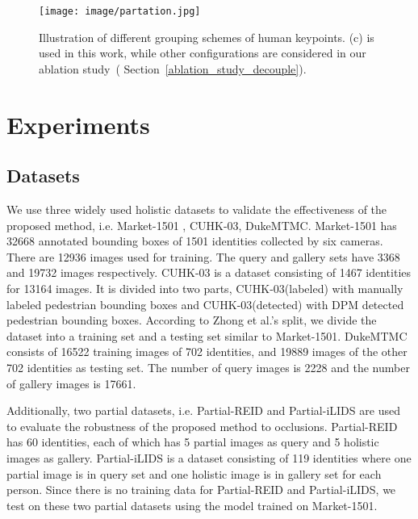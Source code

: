 \documentclass[10pt,twocolumn,letterpaper]{article}
\begin{document}
\begin{figure}[h]		 \vspace{-1mm}
	\begin{center}
		\begin{minipage}[t]{1.0\linewidth}
\texttt{[image: image/partation.jpg]}
		\end{minipage}
	\end{center}
	\vspace{-4mm}
	\caption{Illustration of different grouping schemes of human keypoints. (c) is used in this work, while other configurations are considered in our ablation study~( Section~\ref{ablation_study_decouple}).}
	\label{image:partation}
	\vspace{-5mm}
\end{figure}


\section{Experiments}

\subsection{Datasets}
We use three widely used holistic datasets to validate the effectiveness of the proposed method, i.e. Market-1501 \cite{zheng2015scalable}, CUHK-03\cite{li2014deepreid}, DukeMTMC\cite{zheng2017unlabeled,ristani2016MTMC}. Market-1501 has 32668 annotated bounding boxes of 1501 identities collected by six cameras. There are 12936 images used for training. The query and gallery sets have 3368 and 19732 images respectively. CUHK-03 is a dataset consisting of 1467 identities for 13164 images. It is divided into two parts, CUHK-03(labeled) with manually labeled pedestrian bounding boxes and CUHK-03(detected) with DPM detected pedestrian bounding boxes. According to Zhong et al.\cite{zhong2017re}'s split, we divide the dataset into a training set and a testing set similar to Market-1501. DukeMTMC consists of 16522 training images of 702 identities, and 19889 images of the other 702 identities as testing set. The number of query images is 2228 and the number of gallery images is 17661.

Additionally, two partial datasets, i.e. Partial-REID \cite{zheng2015partial} and Partial-iLIDS \cite{zheng2011person} are used to evaluate the robustness of the proposed method to occlusions. Partial-REID has 60 identities, each of which has 5 partial images as query and 5 holistic images as gallery. Partial-iLIDS is a dataset consisting of 119 identities where one partial image is in query set and one holistic image is in gallery set for each person. Since there is no training data for Partial-REID and Partial-iLIDS, we test on these two partial datasets using the model trained on Market-1501.
\end{document}
